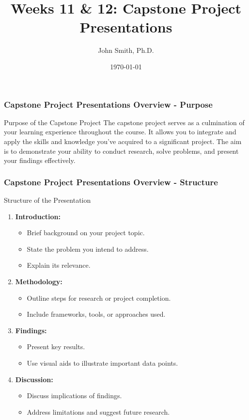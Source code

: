 \documentclass[aspectratio=169]{beamer}
\title[Capstone Project Presentations]{Weeks 11 \& 12: Capstone Project Presentations}
\author[]{John Smith, Ph.D.}
\institute[University Name]{
  Department of Computer Science\\
  University Name\\
  \vspace{0.3cm}
  Email: email@university.edu\\
  Website: www.university.edu
}
\date{\today}
\begin{document}
\frame{\titlepage}

\begin{frame}[fragile]
    \frametitle{Capstone Project Presentations Overview - Purpose}
    \begin{block}{Purpose of the Capstone Project}
        The capstone project serves as a culmination of your learning experience throughout the course. 
        It allows you to integrate and apply the skills and knowledge you've acquired to a significant project. 
        The aim is to demonstrate your ability to conduct research, solve problems, and present your findings effectively.
    \end{block}
\end{frame}

\begin{frame}[fragile]
    \frametitle{Capstone Project Presentations Overview - Structure}
    \begin{block}{Structure of the Presentation}
        \begin{enumerate}
            \item \textbf{Introduction:}
            \begin{itemize}
                \item Brief background on your project topic.
                \item State the problem you intend to address.
                \item Explain its relevance.
            \end{itemize}

            \item \textbf{Methodology:}
            \begin{itemize}
                \item Outline steps for research or project completion.
                \item Include frameworks, tools, or approaches used.
            \end{itemize}

            \item \textbf{Findings:}
            \begin{itemize}
                \item Present key results.
                \item Use visual aids to illustrate important data points.
            \end{itemize}

            \item \textbf{Discussion:}
            \begin{itemize}
                \item Discuss implications of findings.
                \item Address limitations and suggest future research.
            \end{itemize}


\end{enumerate}
\end{block}
\end{frame}
\end{document}
